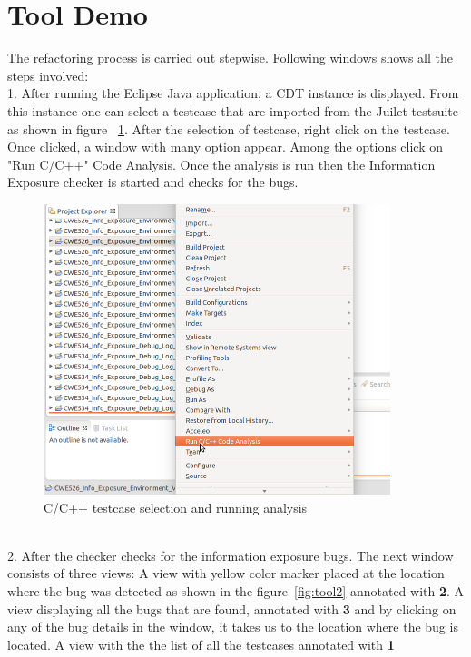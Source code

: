 \section{Tool Demo}
The refactoring process is carried out stepwise. Following windows shows all the steps involved:\\
1. After running the Eclipse Java application, a CDT instance is displayed. From this
instance one can select a testcase that are imported from the Juilet testsuite as shown in figure
~\ref{fig:tool1}.
After the selection of testcase, right click on the testcase. Once clicked,
a window with many option appear. Among the options click on "Run C/C++" Code Analysis.
Once the analysis is run then the Information Exposure checker is started and checks for
the bugs.\\
\begin{figure}[!htb]
\centering
\includegraphics[width=0.9\textwidth]{png/Tool1.png}
\caption{C/C++ testcase selection and running analysis}
\label{fig:tool1}
\end{figure}\\
2. After the checker checks for the information exposure bugs. The next window consists of three views: A view
with yellow color
marker placed at the location where the bug was detected as shown in the figure~\ref{fig:tool2} annotated 
with \textbf{2}. A view displaying all the bugs that are found, annotated with \textbf{3} and by clicking on 
any of the bug details in the window, it takes us to the location where the bug is located. A view with the the list
of all the testcases annotated with \textbf{1}\\

